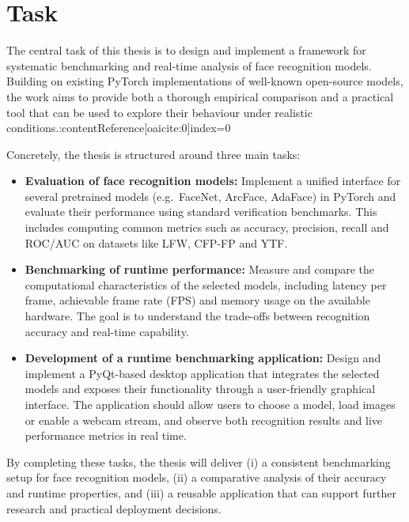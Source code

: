 \section{Task}
The central task of this thesis is to design and implement a framework for systematic benchmarking and real-time analysis of face recognition models. Building on existing PyTorch implementations of well-known open-source models, the work aims to provide both a thorough empirical comparison and a practical tool that can be used to explore their behaviour under realistic conditions.:contentReference[oaicite:0]{index=0}

Concretely, the thesis is structured around three main tasks:

\begin{itemize}
	\item \textbf{Evaluation of face recognition models:} Implement a unified interface for several pretrained models (e.g.\ FaceNet, ArcFace, AdaFace) in PyTorch and evaluate their performance using standard verification benchmarks. This includes computing common metrics such as accuracy, precision, recall and ROC/AUC on datasets like LFW, CFP-FP and YTF.
	
	\item \textbf{Benchmarking of runtime performance:} Measure and compare the computational characteristics of the selected models, including latency per frame, achievable frame rate (FPS) and memory usage on the available hardware. The goal is to understand the trade-offs between recognition accuracy and real-time capability.
	
	\item \textbf{Development of a runtime benchmarking application:} Design and implement a PyQt-based desktop application that integrates the selected models and exposes their functionality through a user-friendly graphical interface. The application should allow users to choose a model, load images or enable a webcam stream, and observe both recognition results and live performance metrics in real time.
\end{itemize}

By completing these tasks, the thesis will deliver (i) a consistent benchmarking setup for face recognition models, (ii) a comparative analysis of their accuracy and runtime properties, and (iii) a reusable application that can support further research and practical deployment decisions.


